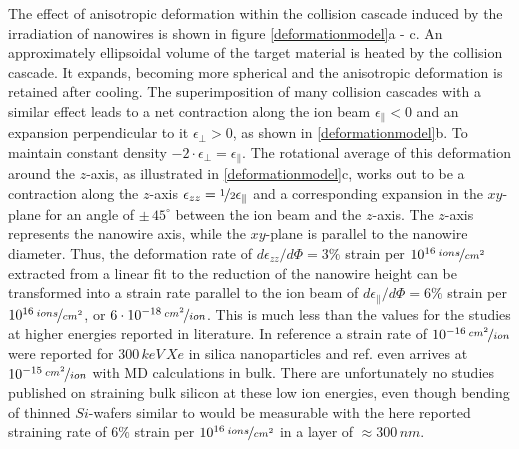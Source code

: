 The effect of anisotropic deformation within the collision cascade induced by the irradiation of nanowires is shown in figure \ref{deformationmodel}a - c. An approximately ellipsoidal volume of the target material is heated by the collision cascade. It expands, becoming more spherical and the anisotropic deformation is retained after cooling. The superimposition of many collision cascades with a similar effect leads to a net contraction along the ion beam $\epsilon_{\parallel} < 0$ and an expansion perpendicular to it $\epsilon_{\perp} > 0$, as shown in \ref{deformationmodel}b. To maintain constant density $-2\cdot\epsilon_{\perp} =  \epsilon_{\parallel}$. The rotational average of this deformation around the $z$-axis, as illustrated in \ref{deformationmodel}c, works out to be a contraction along the $z$-axis $\epsilon_{zz} = \nicefrac{1}{2} \epsilon_{\parallel}$ and a corresponding expansion in the $xy$-plane for an angle of $\pm\, 45^\circ$ between the ion beam and the $z$-axis. The $z$-axis represents the nanowire axis, while the $xy$-plane is parallel to the nanowire diameter. Thus, the deformation rate of $d\epsilon_{zz}/d\Phi = 3\%$ strain per $10^{16}\,\nicefrac{ions}{cm^2}$ extracted from a linear fit to the reduction of the nanowire height can be transformed into a strain rate parallel to the ion beam of $d\epsilon_{\parallel}/d\Phi = 6\%$ strain per $10^{16}\,\nicefrac{ions}{cm^2}$, or $6\cdot 10^{-18}\,\nicefrac{cm^2}{ion}$. This is much less than the values for the studies at higher energies reported in literature. In reference \cite{dillen_ion_2003} a strain rate of $10^{-16}\,\nicefrac{cm^2}{ion}$ were reported for $300\,keV\,Xe$ in silica nanoparticles and ref. \cite{baumer_prediction_2014} even arrives at $10^{-15}\,\nicefrac{cm^2}{ion}$ with MD calculations in bulk. There are unfortunately no studies published on straining bulk silicon at these low ion energies, even though bending of thinned $Si$-wafers similar to \cite{volkert_stress_1991,massl_stress_2008} would be measurable with the here reported straining rate of $6\%$ strain per $10^{16}\,\nicefrac{ions}{cm^2}$ in a layer of $\approx 300\,nm$.

